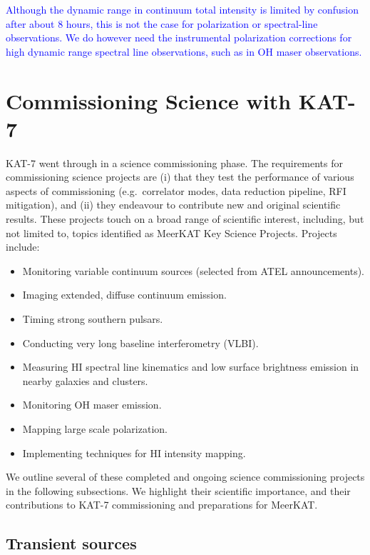 \textcolor{blue}{ Although the dynamic range in continuum total
  intensity is limited by confusion after about 8 hours, this is not
  the case for polarization or spectral-line observations. We do
  however need the instrumental polarization corrections for high
  dynamic range spectral line observations, such as in OH maser
  observations.}


\section{Commissioning Science with KAT-7}
\label{sec:comm}

\noindent
KAT-7 went through in a science commissioning phase.  The requirements
for commissioning science projects are (i) that they test the
performance of various aspects of commissioning (e.g.~correlator
modes, data reduction pipeline, RFI mitigation), and (ii) they
endeavour to contribute new and original scientific results.  These
projects touch on a broad range of scientific interest, including, but
not limited to, topics identified as MeerKAT Key Science Projects.
Projects include:

\begin{itemize}
\item Monitoring variable continuum sources (selected from ATEL
  announcements).
\item Imaging extended, diffuse continuum emission.
\item Timing strong southern pulsars.
\item Conducting very long baseline interferometry (VLBI).
\item Measuring HI spectral line kinematics and low surface brightness emission in nearby galaxies and clusters.
\item Monitoring OH maser emission.
\item Mapping large scale polarization.
\item Implementing techniques for HI intensity mapping.
\end{itemize}

\noindent
We outline several of these completed and ongoing science
commissioning projects in the following subsections.  We highlight
their scientific importance, and their contributions to KAT-7
commissioning and preparations for MeerKAT.

\subsection{Transient sources}

